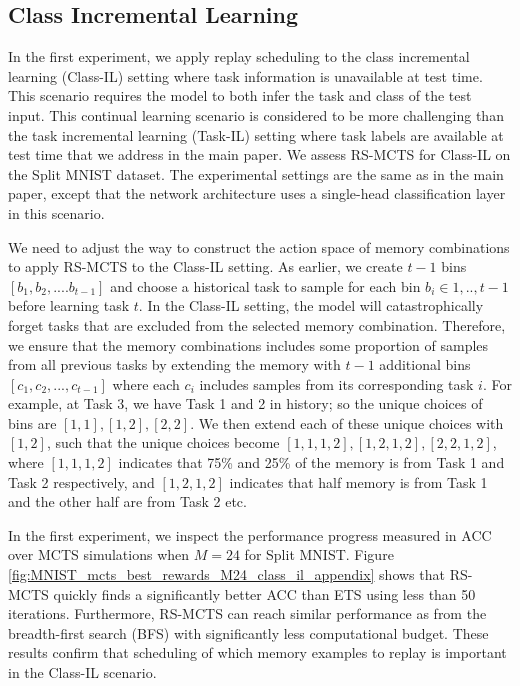\subsection{Class Incremental Learning}

In the first experiment, we apply replay scheduling to the class incremental learning (Class-IL) setting where task information is unavailable at test time. This scenario requires the model to both infer the task and class of the test input. This continual learning scenario is considered to be more challenging than the task incremental learning (Task-IL) setting where task labels are available at test time that we address in the main paper. We assess RS-MCTS for Class-IL on the Split MNIST dataset. The experimental settings are the same as in the main paper, except that the network architecture uses a single-head classification layer in this scenario. 

We need to adjust the way to construct the action space of memory combinations to apply RS-MCTS to the Class-IL setting. As earlier, we create $t-1$ bins $[b_1, b_2, ....b_{t-1}]$ and choose a historical task to sample for each bin $b_i \in {1,.., t-1}$ before learning task $t$. In the Class-IL setting, the model will catastrophically forget tasks that are excluded from the selected memory combination. Therefore, we ensure that the memory combinations includes some proportion of samples from all previous tasks by extending the memory with $t-1$ additional bins $[c_1, c_2, ..., c_{t-1}]$ where each $c_i$ includes samples from its corresponding task $i$. For example, at Task 3, we have Task 1 and 2 in history; so the unique choices of bins are $[1,1], [1,2], [2,2]$. We then extend each of these unique choices with $[1, 2]$, such that the unique choices become $[1,1,1,2], [1,2,1,2], [2,2,1,2]$, where $[1,1,1,2]$ indicates that 75\% and 25\% of the memory is from Task 1 and Task 2 respectively, and $[1,2,1,2]$ indicates that half memory is from Task 1 and the other half are from Task 2 etc.

In the first experiment, we inspect the performance progress measured in ACC over MCTS simulations when $M=24$ for Split MNIST. Figure \ref{fig:MNIST_mcts_best_rewards_M24_class_il_appendix} shows that RS-MCTS quickly finds a significantly better ACC than ETS using less than 50 iterations. Furthermore, RS-MCTS can reach similar performance as from the breadth-first search (BFS) with significantly less computational budget. These results confirm that scheduling of which memory examples to replay is important in the Class-IL scenario. 

